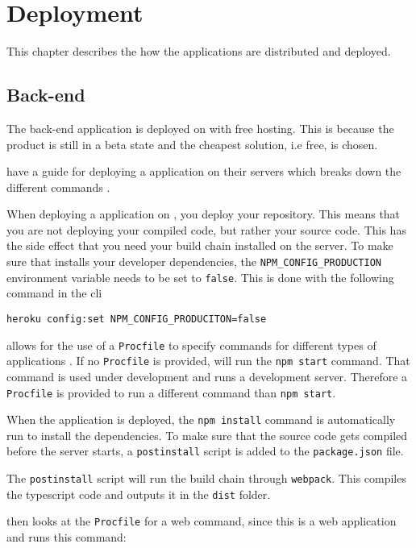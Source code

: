 \chapter{Deployment}
This chapter describes the how the applications are distributed and deployed.

\section{Back-end}
The back-end application is deployed on  with free hosting. This is because the product is still in a beta state and the cheapest solution, i.e free, is chosen.

 have a guide for deploying a  application on their servers which breaks down the different commands \citep{documentation:deployment:heroku}.

When deploying a  application on , you deploy your  repository. 
This means that you are not deploying your compiled code, but rather your source code.
This has the side effect that you need your build chain installed on the  server.
To make sure that  installs your developer dependencies, the \verb+NPM_CONFIG_PRODUCTION+ environment variable needs to be set to \verb+false+.
This is done with the following command in the \gls{cli}

\verb+heroku config:set NPM_CONFIG_PRODUCITON=false+

 allows for the use of a \verb+Procfile+ to specify commands for different types of applications \citep{documentation:deployment:heroku:procfile}.
If no \verb+Procfile+ is provided,  will run the \verb+npm start+ command.
That command is used under development and runs a development server.
Therefore a \verb+Procfile+ is provided to run a different command than \verb+npm start+.

When the application is deployed, the \verb+npm install+ command is automatically run to install the dependencies. 
To make sure that the source code gets compiled before the server starts, a \verb+postinstall+ script is added to the \verb+package.json+ file.

The \verb+postinstall+ script will run the build chain through \verb+webpack+. 
This compiles the \gls{typescript} code and outputs it in the \verb+dist+ folder.

 then looks at the \verb+Procfile+ for a web command, since this is a web application and runs this command:

